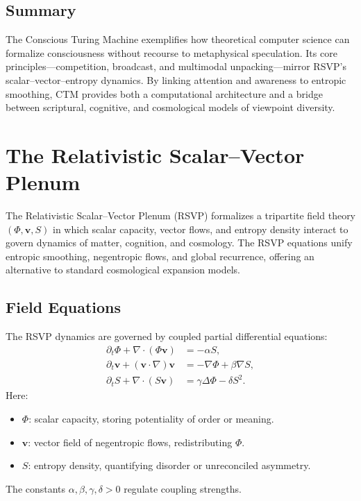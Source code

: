 \documentclass[a4paper,11pt,openany]{book}
\begin{document}
\section{Summary}
The Conscious Turing Machine exemplifies how theoretical computer science can formalize 
consciousness without recourse to metaphysical speculation. Its core principles—competition, 
broadcast, and multimodal unpacking—mirror RSVP’s scalar–vector–entropy dynamics. By linking 
attention and awareness to entropic smoothing, CTM provides both a computational architecture 
and a bridge between scriptural, cognitive, and cosmological models of viewpoint diversity.

\chapter{The Relativistic Scalar–Vector Plenum}

The Relativistic Scalar–Vector Plenum (RSVP) formalizes a tripartite field theory 
\((\Phi,\mathbf{v},S)\) in which scalar capacity, vector flows, and entropy density interact 
to govern dynamics of matter, cognition, and cosmology. The RSVP equations unify entropic 
smoothing, negentropic flows, and global recurrence, offering an alternative to 
standard cosmological expansion models.  

\section{Field Equations}

The RSVP dynamics are governed by coupled partial differential equations:
\begin{align}
\partial_t \Phi + \nabla \cdot (\Phi \mathbf{v}) &= -\alpha S, \label{eq:phi}\\
\partial_t \mathbf{v} + (\mathbf{v}\cdot\nabla)\mathbf{v} &= -\nabla \Phi + \beta \nabla S, \label{eq:v}\\
\partial_t S + \nabla\cdot(S\mathbf{v}) &= \gamma \Delta \Phi - \delta S^2. \label{eq:s}
\end{align}
Here:
\begin{itemize}
  \item $\Phi$: scalar capacity, storing potentiality of order or meaning.
  \item $\mathbf{v}$: vector field of negentropic flows, redistributing $\Phi$.
  \item $S$: entropy density, quantifying disorder or unreconciled asymmetry.
\end{itemize}
The constants $\alpha,\beta,\gamma,\delta>0$ regulate coupling strengths.
\end{document}
